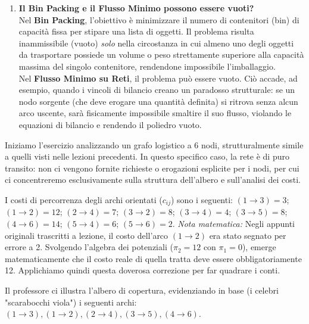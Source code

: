 \documentclass[12pt, a4paper]{article}
\begin{document}
\begin{enumerate}
		\item \textbf{Il Bin Packing e il Flusso Minimo possono essere vuoti?}\\
		Nel \textbf{Bin Packing}, l'obiettivo è minimizzare il numero di contenitori (bin) di capacità fissa per stipare una lista di oggetti. Il problema risulta inammissibile (vuoto) \textit{solo} nella circostanza in cui almeno uno degli oggetti da trasportare possiede un volume o peso strettamente superiore alla capacità massima del singolo contenitore, rendendone impossibile l'imballaggio.\\
		Nel \textbf{Flusso Minimo su Reti}, il problema può essere vuoto. Ciò accade, ad esempio, quando i vincoli di bilancio creano un paradosso strutturale: se un nodo sorgente (che deve erogare una quantità definita) si ritrova senza alcun arco uscente, sarà fisicamente impossibile smaltire il suo flusso, violando le equazioni di bilancio e rendendo il poliedro vuoto.
	\end{enumerate}
	
	Iniziamo l'esercizio analizzando un grafo logistico a 6 nodi, strutturalmente simile a quelli visti nelle lezioni precedenti. In questo specifico caso, la rete è di puro transito: non ci vengono fornite richieste o erogazioni esplicite per i nodi, per cui ci concentreremo esclusivamente sulla struttura dell'albero e sull'analisi dei costi.
	
	I costi di percorrenza degli archi orientati ($c_{ij}$) sono i seguenti:
	$(1\to3) = 3$; \quad $(1\to2) = 12$; \quad $(2\to4) = 7$; \quad $(3\to2) = 8$; \quad $(3\to4) = 4$; \quad $(3\to5) = 8$; \quad $(4\to6) = 14$; \quad $(5\to4) = 6$; \quad $(5\to6) = 2$.
	\textit{Nota matematica:} Negli appunti originali trascritti a lezione, il costo dell'arco $(1\to2)$ era stato segnato per errore a 2. Svolgendo l'algebra dei potenziali ($\pi_2 = 12$ con $\pi_1 = 0$), emerge matematicamente che il costo reale di quella tratta deve essere obbligatoriamente 12. Applichiamo quindi questa doverosa correzione per far quadrare i conti.
	
	Il professore ci illustra l'albero di copertura, evidenziando in base (i celebri "scarabocchi viola") i seguenti archi: \textbf{$(1\to3), (1\to2), (2\to4), (3\to5), (4\to6)$}.
	
\end{document}
